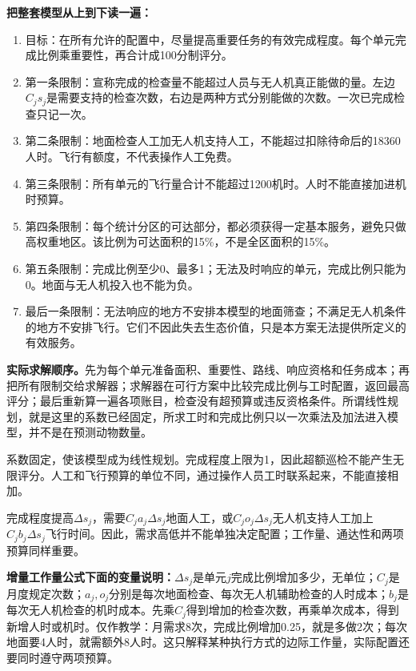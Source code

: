 \documentclass[12pt,a4paper]{article}
\numberwithin{equation}{section}
\begin{document}
\noindent\textbf{把整套模型从上到下读一遍：}
\begin{enumerate}
\item 目标：在所有允许的配置中，尽量提高重要任务的有效完成程度。每个单元完成比例乘重要性，再合计成100分制评分。
\item 第一条限制：宣称完成的检查量不能超过人员与无人机真正能做的量。左边$C_js_j$是需要支持的检查次数，右边是两种方式分别能做的次数。一次已完成检查只记一次。
\item 第二条限制：地面检查人工加无人机支持人工，不能超过扣除待命后的18360人时。飞行有额度，不代表操作人工免费。
\item 第三条限制：所有单元的飞行量合计不能超过1200机时。人时不能直接加进机时预算。
\item 第四条限制：每个统计分区的可达部分，都必须获得一定基本服务，避免只做高权重地区。该比例为可达面积的15\%，不是全区面积的15\%。
\item 第五条限制：完成比例至少0、最多1；无法及时响应的单元，完成比例只能为0。地面与无人机投入也不能为负。
\item 最后一条限制：无法响应的地方不安排本模型的地面筛查；不满足无人机条件的地方不安排飞行。它们不因此失去生态价值，只是本方案无法提供所定义的有效服务。
\end{enumerate}
\noindent\textbf{实际求解顺序。}先为每个单元准备面积、重要性、路线、响应资格和任务成本；再把所有限制交给求解器；求解器在可行方案中比较完成比例与工时配置，返回最高评分；最后重新算一遍各项账目，检查没有超预算或违反资格条件。所谓线性规划，就是这里的系数已经固定，所求工时和完成比例只以一次乘法及加法进入模型，并不是在预测动物数量。

系数固定，使该模型成为线性规划。完成程度上限为1，因此超额巡检不能产生无限评分。人工和飞行预算的单位不同，通过操作人员工时联系起来，不能直接相加。

完成程度提高$\Delta s_j$，需要$C_ja_j\Delta s_j$地面人工，或$C_jo_j\Delta s_j$无人机支持人工加上$C_jb_j\Delta s_j$飞行时间。因此，需求高低并不能单独决定配置；工作量、通达性和两项预算同样重要。

\noindent\textbf{增量工作量公式下面的变量说明：}$\Delta s_j$是单元$j$完成比例增加多少，无单位；$C_j$是月度规定次数；$a_j,o_j$分别是每次地面检查、每次无人机辅助检查的人时成本；$b_j$是每次无人机检查的机时成本。先乘$C_j$得到增加的检查次数，再乘单次成本，得到新增人时或机时。仅作教学：月需求8次，完成比例增加0.25，就是多做2次；每次地面要4人时，就需额外8人时。这只解释某种执行方式的边际工作量，实际配置还要同时遵守两项预算。

\clearpage

\end{document}
